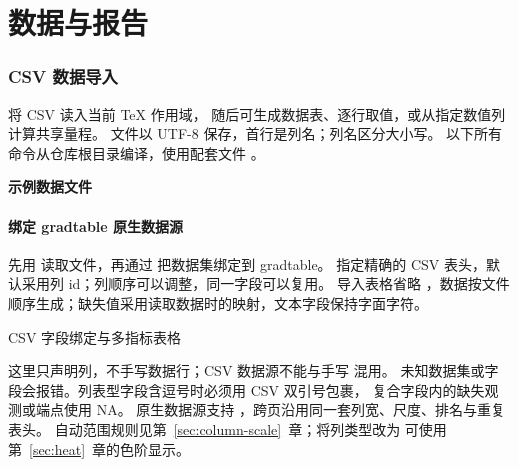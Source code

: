 \part{数据与报告}

\section{CSV 数据导入}
\label{sec:csv-input}
 将 CSV 读入当前 TeX 作用域，
随后可生成数据表、逐行取值，或从指定数值列计算共享量程。
文件以 UTF-8 保存，首行是列名；列名区分大小写。
以下所有命令从仓库根目录编译，使用配套文件 。

\textbf{示例数据文件}\par


\subsection{绑定 gradtable 原生数据源}
\label{sec:csv-native}
先用 \key{\gradbarsloadcsv} 读取文件，再通过  把数据集绑定到 gradtable。
 指定精确的 CSV 表头，默认采用列 id；列顺序可以调整，同一字段可以复用。
导入表格省略 ，数据按文件顺序生成；缺失值采用读取数据时的映射，文本字段保持字面字符。
\begin{example}[text and listing,sidebyside=false]{CSV 字段绑定与多指标表格}
\begin{center}
\begin{gradtable}[align=c,header align=c,data=results,width=\linewidth,scale=column]
\end{gradtable}
\end{center}
\end{example}
这里只声明列，不手写数据行；CSV 数据源不能与手写  混用。
未知数据集或字段会报错。列表型字段含逗号时必须用 CSV 双引号包裹，
复合字段内的缺失观测或端点使用 NA。
原生数据源支持 ，跨页沿用同一套列宽、尺度、排名与重复表头。
自动范围规则见第~\ref{sec:column-scale}~章；将列类型改为  可使用第~\ref{sec:heat}~章的色阶显示。

